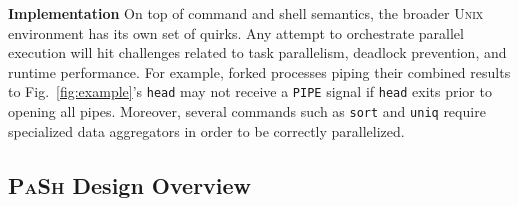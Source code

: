 \documentclass[sigplan, review, screen, anonymous]{acmart}
\newcommand{\heading}[1]{\vspace{4pt}\noindent\textbf{#1}\enspace}
\newcommand{\ttt}[1]{\texttt{#1}}
\newcommand{\sys}{{\scshape PaSh}\xspace}
\newcommand{\unix}{{\scshape Unix}\xspace}
\begin{document}
\heading{Implementation} %
On top of command and shell semantics, the broader \unix environment has its own set of quirks.
Any attempt to orchestrate parallel execution will hit challenges related to task parallelism, deadlock prevention, and runtime performance.
For example, forked processes piping their combined results to Fig.~\ref{fig:example}'s \ttt{head} may not receive a \ttt{PIPE} signal if \ttt{head} exits prior to opening all pipes.
Moreover, several commands such as \ttt{sort} and \ttt{uniq} require specialized data aggregators in order to be correctly parallelized.


\subsection{\sys Design Overview}
\label{bg:overview}
\end{document}
